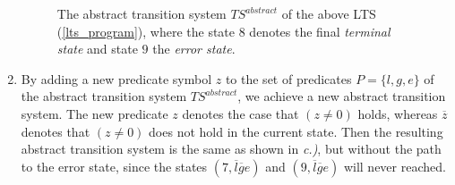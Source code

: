 \begin{enumerate}
\begin{figure}[th]
\caption{{\protect\small The abstract transition system $TS^{abstract}$ of the above LTS (\ref{lts_program}), where the state $8$ denotes the final \textit{terminal state} and state $9$ the \textit{error state}.}}
\label{abstraction_graph}
\end{figure}

\item By adding a new predicate symbol $z$ to the set of predicates $P=\{l,g,e\}$
of the abstract transition system $TS^{abstract}$, we achieve a new abstract
transition system. The new predicate $z$ denotes the case that $(z\neq 0)$
holds, whereas $\overline{z}$ denotes that $(z\neq 0)$ does not hold in the
current state. Then the resulting abstract transition system is the same as
shown in \textit{c.)}, but without the path to the error state, since the
states $(7,\overline{l}\overline{g}e)$ and $(9,\overline{l}\overline{g}e)$
will never reached.


\end{enumerate}
